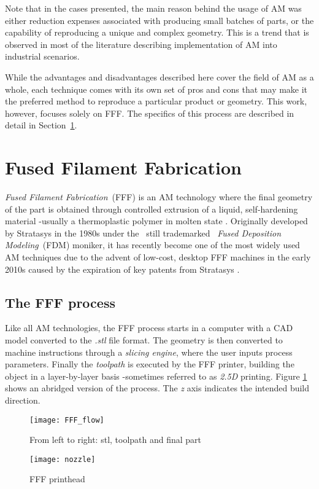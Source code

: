 \documentclass[main.tex]{subfiles}
\begin{document}
Note that in the cases presented, the main reason behind the usage of AM was either reduction expenses associated with producing small batches of parts, or the capability of reproducing a unique and complex geometry. This is a trend that is observed in most of the literature describing implementation of AM into industrial scenarios.

While the advantages and disadvantages described here cover the field of AM as a whole, each technique comes with its own set of pros and cons that may make it the preferred method to reproduce a particular product or geometry. This work, however, focuses solely on FFF. The specifics of this process are described in detail in Section~\ref{sec:FFF}.
\section{Fused Filament Fabrication}\label{sec:FFF} 
\emph{Fused Filament Fabrication}~(FFF) is an AM technology where the final geometry of the part is obtained through controlled extrusion of a liquid, self-hardening material -usually a thermoplastic polymer in molten state \cite{Gibson2015}. Originally developed by Stratasys in the 1980s under the \textendash~still trademarked \textendash~\emph{Fused Deposition Modeling}~(FDM\texttrademark) moniker, it has recently become one of the most widely used AM techniques due to the advent of low-cost, desktop FFF machines in the early 2010s caused by the expiration of key patents from Stratasys \cite{Gibson2015,Capote2017}. 

\pagebreak
\subsection{The FFF process}\label{ssec:FFFmach}
Like all AM technologies, the FFF process starts in a computer with a CAD model converted to the \emph{.stl} file format. The geometry is then converted to machine instructions through a \emph{slicing engine}, where the user inputs process parameters. Finally the \emph{toolpath} is executed by the FFF printer, building the object in a layer-by-layer basis -sometimes referred to as \emph{2.5D} printing. Figure \ref{fig:FFFflow} shows an abridged version of the process. The \emph{z} axis indicates the intended build direction. 
\begin{figure}[h]
	\center
	\texttt{[image: FFF\_flow]}
	\caption{From left to right: stl, toolpath and final part} \label{fig:FFFflow}
\end{figure}
\begin{figure}[h]
	\center
	\texttt{[image: nozzle]}
	\caption{FFF printhead} \label{fig:FFFnoz}
\end{figure}
% 
%
\end{document}
